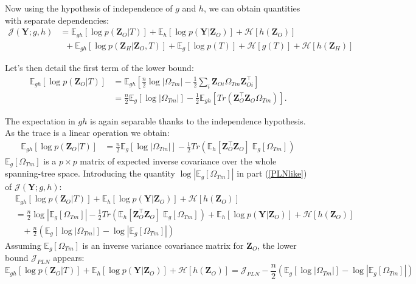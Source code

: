 \documentclass[11pt,a4paper]{article}
\newcommand{\entr}{\mathcal{H}}
\newcommand{\Ybf}{\boldsymbol{Y}}
\newcommand{\Zbf}{\boldsymbol{Z}}
\newcommand{\Esp}{\mathds{E}}
\begin{document}
Now using the hypothesis of independence of $g$ and $h$, we can obtain quantities with separate dependencies:
\begin{align}
\mathcal{J}(\Ybf; g,h)&=  \Esp_{gh}[\log p(\Zbf_O | T)] +\Esp_h[\log p(\Ybf|\Zbf_O)]+\entr[h(\Zbf_O)]  \label{PLNlike}\\
& \;\; + \Esp_{gh}[\log p(\Zbf_H | \Zbf_O,T) ]+\Esp_g[\log p(T)] +\entr[g(T)]+\entr[h(\Zbf_H)] \label{new}
\end{align}

Let's then detail the first term of the lower bound:
\begin{align*}
\Esp_{gh}[\log p(\Zbf_O|T)] &=  \Esp_{gh} \left[\frac{n}{2} \log |\Omega_{Tm}| - \frac{1}{2} \sum_i \Zbf_{Oi}\Omega_{Tm} \Zbf_{Oi}^\intercal  \right]\\
&= \frac{n}{2} \Esp_g [\log |\Omega_{Tm}|] - \frac{1}{2} \Esp_{gh}\left[Tr\left( \Zbf_O^\intercal \Zbf_O \Omega_{Tm}\right)\right].
\end{align*}

The expectation in $gh$ is again separable thanks to the independence hypothesis. As the trace is a linear operation we obtain:
\begin{align*}
\Esp_{gh}[\log p(\Zbf_O|T)] &=\frac{n}{2} \Esp_g [\log |\Omega_{Tm}|] - \frac{1}{2}  Tr\left(\Esp_h [\Zbf_O^\intercal \Zbf_O ]\; \Esp_g[\Omega_{Tm}]\right) 
\end{align*}
$\Esp_g [\Omega_{Tm}]$ is a $p\times p$ matrix of expected inverse covariance over the whole spanning-tree space. Introducing the quantity  $\log |\Esp_g [\Omega_{Tm}]| $ in part (\ref{PLNlike}) of $\mathcal{J}(\Ybf; g,h)$:
\begin{align*}
&\Esp_{gh}[\log p(\Zbf_O | T)] +\Esp_h[\log p(\Ybf|\Zbf_O)]+ \entr[h(\Zbf_O)]\\
& = \frac{n}{2} \log |\Esp_g [\Omega_{Tm}]| - \frac{1}{2}Tr\left(\Esp_h [\Zbf_O^\intercal \Zbf_O ]\; \Esp_g[\Omega_{Tm}]\right)+ \Esp_{h}[\log p(\Ybf|\Zbf_O)] + \entr[h(\Zbf_O)]\\
& \;\;\;+  \frac{n}{2}\left( \Esp_g[\log|\Omega_{Tm}|] - \log|\Esp_g [\Omega_{Tm}]|\right)
\end{align*}
Assuming $\Esp_g [\Omega_{Tm}]$ is an inverse variance covariance matrix for $\Zbf_O$, the lower bound $\mathcal{J}_{PLN}$ appears:
 $$\Esp_{gh}[\log p(\Zbf_O | T)] +\Esp_h[\log p(\Ybf|\Zbf_O)]+ \entr[h(\Zbf_O)] = \mathcal{J}_{PLN} - \frac{n}{2}\left( \Esp_g[\log|\Omega_{Tm}|] - \log|\Esp_g [\Omega_{Tm}]|\right)$$
 
\end{document}
